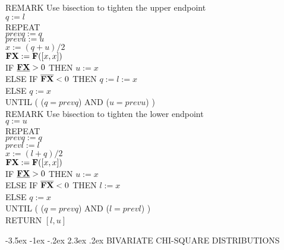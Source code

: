 \documentclass[10pt,letterpaper]{article}
\makeatletter
\renewcommand\section{\@startsection {section}{1}{\z@}%
                 {-3.5ex \@plus -1ex \@minus -.2ex}%
                 {2.3ex \@plus.2ex}%
                 {\normalfont\normalsize\bfseries }}
\makeatother
\begin{document}
\begin{tabbing}
REMARK Use bisection to tighten the upper endpoint \\
$ q := l $ \\ 
REPEAT \\
\> $ prevq := q $ \\
\> $ prevu := u $ \\
\> $ x := (q + u) / 2 $ \\
\> $ {\bf FX} := {\bf F}([x,x]) $ \\
\> IF $\underline{{\bf FX}} > 0$ THEN $ u := x $ \\
\> ELSE IF $\overline{{\bf FX}} < 0 $ THEN $ q := l := x $ \\
\> ELSE $ q := x$ \\
UNTIL ( ($q = prevq$) AND ($u = prevu$) ) \\

REMARK Use bisection to tighten the lower endpoint \\
$ q := u $ \\ 
REPEAT \\
\> $ prevq := q $ \\
\> $ prevl := l $ \\
\> $ x := (l + q) / 2 $ \\
\> $ {\bf FX} := {\bf F}([x,x]) $ \\
\> IF $\underline{{\bf FX}} > 0$ THEN $ u := x $ \\
\> ELSE IF $\overline{{\bf FX}} < 0 $ THEN $ l := x $ \\
\> ELSE $ q := x$ \\
UNTIL ( ($q = prevq$) AND ($l = prevl$) ) \\

RETURN $[l,u]$

\end{tabbing}

\section{BIVARIATE CHI-SQUARE DISTRIBUTIONS\label{sec:bivchi}}
\end{document}

